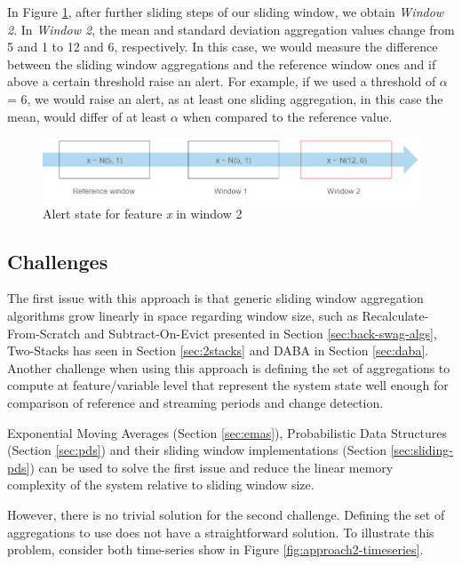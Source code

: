 In Figure \ref{fig:approach2-alert-state}, after further sliding steps of our sliding window, we obtain \textit{Window 2}. In \textit{Window 2}, the mean and standard deviation aggregation values change from 5 and 1 to 12 and 6, respectively. In this case, we would measure the difference between the sliding window aggregations and the reference window ones and if above a certain threshold raise an alert. For example, if we used a threshold of $\alpha$ = 6, we would raise an alert, as at least one sliding aggregation, in this case the mean, would differ of at least $\alpha$ when compared to the reference value.

\begin{figure}[!htb]
    \begin{center}
      \includegraphics[scale=0.65]{figures/approach2-alert.png}
      \caption[]{Alert state for feature \textit{x} in window 2}
      \label{fig:approach2-alert-state}
    \end{center}
\end{figure}

\subsection*{Challenges}
The first issue with this approach is that generic sliding window aggregation algorithms grow linearly in space regarding window size, such as Recalculate-From-Scratch and Subtract-On-Evict presented in Section \ref{sec:back-swag-algs}, Two-Stacks has seen in Section \ref{sec:2stacks} and DABA in Section \ref{sec:daba}. Another challenge when using this approach is defining the set of aggregations to compute at feature/variable level that represent the system state well enough for comparison of reference and streaming periods and change detection. 

Exponential Moving Averages (Section \ref{sec:emas}), Probabilistic Data Structures (Section \ref{sec:pds}) and their sliding window implementations (Section \ref{sec:sliding-pds}) can be used to solve the first issue and reduce the linear memory complexity of the system relative to sliding window size. 

However, there is no trivial solution for the second challenge. Defining the set of aggregations to use does not have a straightforward solution. To illustrate this problem, consider both time-series show in Figure \ref{fig:approach2-timeseries}.
 
